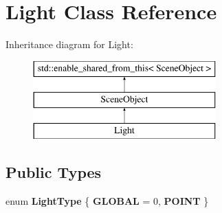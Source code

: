 \hypertarget{class_light}{}\section{Light Class Reference}
\label{class_light}
Inheritance diagram for Light\+:\begin{figure}[H]
\begin{center}
\leavevmode
\includegraphics[height=3.000000cm]{class_light}
\end{center}
\end{figure}
\subsection*{Public Types}
\begin{DoxyCompactItemize}
\item 
\hypertarget{class_light_a661d9480e01af8b1612860b9630ef5f8}{}enum {\bfseries Light\+Type} \{ {\bfseries G\+L\+O\+B\+A\+L} = 0, 
{\bfseries P\+O\+I\+N\+T}
 \}\label{class_light_a661d9480e01af8b1612860b9630ef5f8}

\end{DoxyCompactItemize}
